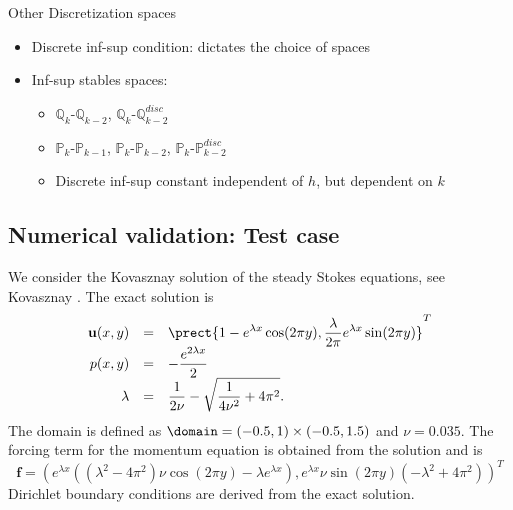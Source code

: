 \begin{block}{Other Discretization spaces}
  \begin{itemize}
   \item Discrete inf-sup condition: dictates the choice of spaces
   \item Inf-sup stables spaces:
	\begin{itemize}
	  \item $\mathbb Q_k$-$\mathbb Q_{k-2}$, $\mathbb Q_k$-$\mathbb Q^{disc}_{k-2}$
	  \item $\mathbb P_k$-$\mathbb P_{k-1}$, $\mathbb P_k$-$\mathbb P_{k-2}$, $\mathbb P_k$-$\mathbb P^{disc}_{k-2}$
	  \item Discrete inf-sup constant independent of $h$, but dependent on $k$
	\end{itemize}
  \end{itemize}
 \end{block}


\subsection{Numerical validation: Test case}

  We consider the Kovasznay solution of the steady Stokes equations, see Kovasznay \cite{kovasznay_test}. The exact solution is
\begin{equation}\label{kovasznay_problem}
\begin{array}{r c l}
 \displaystyle \mathbf{u}(x,y) & = & \displaystyle \prect{1 - e^{\lambda x } \cos (2 \pi y), \frac{\lambda}{2 \pi} e^{\lambda x } \sin (2 \pi y)}^T \\
 \displaystyle p(x,y) & = & \displaystyle -\frac{e^{2 \lambda x}}{2} \\
 \displaystyle \lambda & = & \displaystyle \frac{1}{2 \nu} - \sqrt{\frac{1}{4\nu^2} + 4\pi^2}.
\end{array}
\end{equation}
The domain is defined as  $\domain = (-0.5,1) \times (-0.5,1.5)$ and $\nu = 0.035$. The forcing term for the momentum equation is obtained from the solution and is
\begin{equation}
 \mathbf{f} = \left( e^{\lambda x}  \left( \left( \lambda^2 - 4\pi^2 \right) \nu \cos (2\pi y) - \lambda e^{\lambda x} \right), e^{\lambda x} \nu \sin (2 \pi y) (-\lambda^2 + 4 \pi^2)           \right)^T
\end{equation}
Dirichlet boundary conditions are derived from the exact solution.






